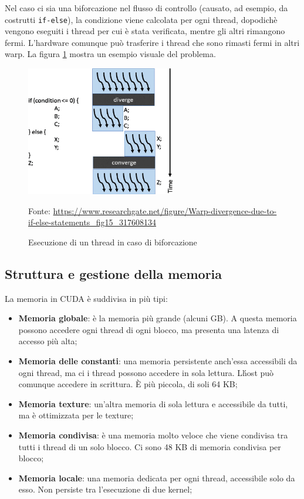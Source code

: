 \documentclass[12pt,a4paper,openright,twoside]{report}
\newcommand{\source}[1]{\vspace{-10pt} \caption*{\scriptsize Fonte: {#1}} }
\begin{document}
Nel caso ci sia una biforcazione nel flusso di controllo (causato, ad esempio, da costrutti \verb|if-else|), la condizione viene calcolata per ogni thread, dopodichè vengono eseguiti i thread per cui è stata verificata, mentre gli altri rimangono fermi. L'hardware comunque può trasferire i thread che sono rimasti fermi in altri warp. La figura \ref{img:warp-branch} mostra un esempio visuale del problema.

\begin{figure}[h]
    \centering
    \includegraphics[width=6.5cm]{warp-branch.png}
    \caption{Esecuzione di un thread in caso di biforcazione}
    \source{\url{https://www.researchgate.net/figure/Warp-divergence-due-to-if-else-statements_fig15_317608134}}
    \label{img:warp-branch}
\end{figure}

\subsection{Struttura e gestione della memoria}

La memoria in CUDA è suddivisa in più tipi:

\begin{itemize}
    \item \textbf{Memoria globale}: è la memoria più grande (alcuni GB). A questa memoria possono accedere ogni thread di ogni blocco, ma presenta una latenza di accesso più alta;
    \item \textbf{Memoria delle constanti}: una memoria persistente anch'essa accessibili da ogni thread, ma ci i thread possono accedere in sola lettura. L\'host può comunque accedere in scrittura. È più piccola, di soli 64 KB;
    \item \textbf{Memoria texture}: un'altra memoria di sola lettura e accessibile da tutti, ma è ottimizzata per le texture;
    \item \textbf{Memoria condivisa}: è una memoria molto veloce che viene condivisa tra tutti i thread di un solo blocco. Ci sono 48 KB di memoria condivisa per blocco;
    \item \textbf{Memoria locale}: una memoria dedicata per ogni thread, accessibile solo da esso. Non persiste tra l'esecuzione di due kernel;
\end{itemize}
\end{document}
